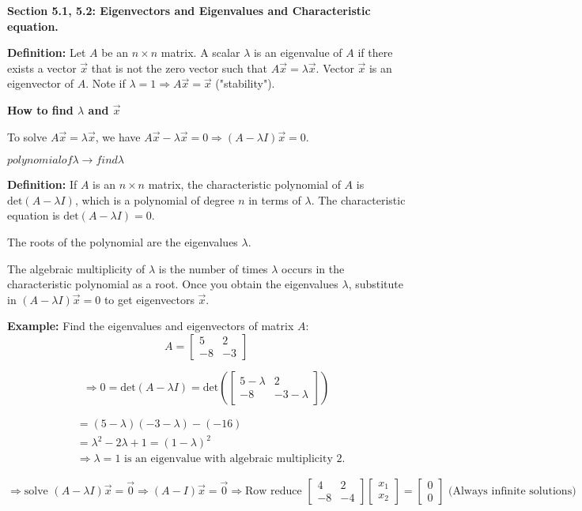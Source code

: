 \documentclass{article}
\begin{document}
\textbf{Section 5.1, 5.2: Eigenvectors and Eigenvalues and Characteristic equation.}

\textbf{Definition:} Let \( A \) be an \( n \times n \) matrix. A scalar \( \lambda \) is an eigenvalue of \( A \) if there exists a vector \( \vec{x} \) that is not the zero vector such that \( A\vec{x} = \lambda\vec{x} \). Vector \( \vec{x} \) is an eigenvector of \( A \). Note if \( \lambda = 1 \Rightarrow A\vec{x} = \vec{x} \) ("stability").

\textbf{How to find \( \lambda \) and \( \vec{x} \)}

To solve \( A\vec{x} = \lambda\vec{x} \), we have \( A\vec{x} - \lambda\vec{x} = 0 \Rightarrow (A - \lambda I)\vec{x} = 0 \).


$polynomial of \lambda \rightarrow find \lambda$

\textbf{Definition:} If \( A \) is an \( n \times n \) matrix, the characteristic polynomial of \( A \) is \( \text{det}(A - \lambda I) \), which is a polynomial of degree \( n \) in terms of \( \lambda \). The characteristic equation is \( \text{det}(A - \lambda I) = 0 \).

The roots of the polynomial are the eigenvalues \( \lambda \).

The algebraic multiplicity of \( \lambda \) is the number of times \( \lambda \) occurs in the characteristic polynomial as a root. Once you obtain the eigenvalues \( \lambda \), substitute in \( (A - \lambda I)\vec{x} = 0 \) to get eigenvectors \( \vec{x} \).

\textbf{Example:} Find the eigenvalues and eigenvectors of matrix \( A \):
\[ A = \begin{bmatrix} 5 & 2 \\ -8 & -3 \end{bmatrix} \]

\[
\Rightarrow 0 = \text{det}(A - \lambda I) = \text{det}\left(\begin{bmatrix} 5-\lambda & 2 \\ -8 & -3-\lambda \end{bmatrix}\right)
\]

\[ 
\begin{aligned}
&= (5-\lambda)(-3-\lambda) - (-16) \\
&= \lambda^2 - 2\lambda + 1 = (1-\lambda)^2 \\
&\Rightarrow \lambda = 1 \text{ is an eigenvalue with algebraic multiplicity } 2.
\end{aligned}
\]

\[
\Rightarrow \text{solve } (A-\lambda I)\vec{x} = \vec{0} \Rightarrow (A-I)\vec{x} = \vec{0} \Rightarrow \text{Row reduce } \begin{bmatrix} 4 & 2 \\ -8 & -4 \end{bmatrix} \begin{bmatrix} x_1 \\ x_2 \end{bmatrix} = \begin{bmatrix} 0 \\ 0 \end{bmatrix} \text{ (Always infinite solutions)}
\]
\end{document}
